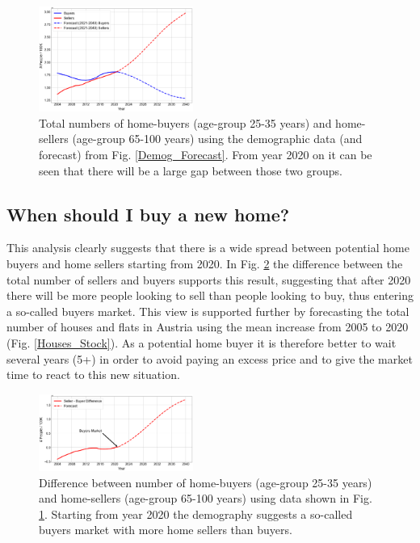 \documentclass[11pt, a4paper, twocolumn]{article}
\begin{document}
\begin{figure}[H]
\includegraphics[width=0.45\textwidth]{../Figures/BS.png}
\caption{\small Total numbers of home-buyers (age-group 25-35 years) and home-sellers (age-group 65-100 years) using the demographic data (and forecast) from Fig. \ref{Demog_Forecast}. From year 2020 on it can be seen that there will be a large gap between those two groups. \label{Buyer_Seller}}
\end{figure}

\subsection*{When should I buy a new home?}
This analysis clearly suggests that there is a wide spread between potential home buyers and home sellers starting from 2020. In Fig. \ref{Buyer_Seller_Difference} the difference between the total number of sellers and buyers supports this result, suggesting that after 2020 there will be more people looking to sell than people looking to buy, thus entering a so-called buyers market. This view is supported further by forecasting the total number of houses and flats in Austria using the mean increase from 2005 to 2020 (Fig. \ref{Houses_Stock}). As a potential home buyer it is therefore better to wait several years (5+) in order to avoid paying an excess price and to give the market time to react to this new situation.

\begin{figure}[!ht]
\includegraphics[width=0.45\textwidth]{../Figures/BS_Diff.png}
\caption{Difference between number of home-buyers (age-group 25-35 years) and home-sellers (age-group 65-100 years) using data shown in Fig. \ref{Buyer_Seller}. Starting from year 2020 the demography suggests a so-called buyers market with more home sellers than buyers.\label{Buyer_Seller_Difference}}
\end{figure}
\end{document}
